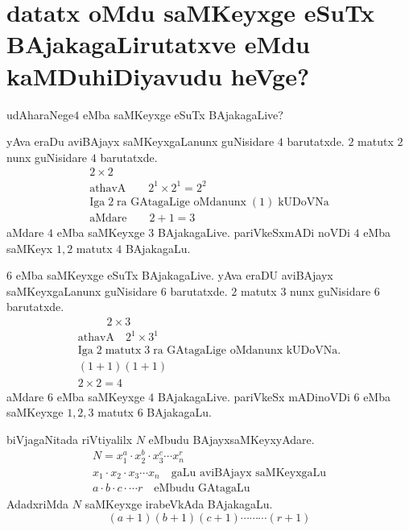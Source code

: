 \chapter{{\bf datatx oMdu saMKeyxge eSuTx BAjakagaLirutatxve eMdu kaMDuhiDiyavudu heVge?}}


udAharaNege\quad $4$ eMba saMKeyxge eSuTx BAjakagaLive?

yAva eraDu aviBAjayx saMKeyxgaLanunx guNisidare $4$ barutatxde. $2$ matutx $2$ nunx guNisidare $4$ barutatxde.
\begin{gather*}
2\times 2\\
\text{athavA} \qquad 2^1\times 2^1 = 2^2\\
\text{Iga}\; 2 \;\text{ra GAtagaLige oMdanunx} \;(1)\; \text{kUDoVNa}\\
\text{aMdare}\qquad 2+1 =3
\end{gather*}
aMdare $4$ eMba saMKeyxge $3$ BAjakagaLive. pariVkeSxmADi noVDi $4$ eMba saMKeyx $1,2$ matutx $4$ BAjakagaLu. 


$6$ eMba saMKeyxge eSuTx BAjakagaLive. yAva eraDU aviBAjayx saMKeyxgaLanunx guNisidare $6$ barutatxde.
$2$ matutx $3$ nunx guNisidare $6$ barutatxde.
\begin{gather*}
\qquad\;\; 2 \times 3\\
\text{athavA}\quad 2^1 \times 3^1\\
\text{Iga} \;2\; \text{matutx} \;3\; \text{ra GAtagaLige oMdanunx kUDoVNa.}\\
(1+1)(1+1)\\
2\times 2 =4 
\end{gather*}
aMdare $6$ eMba saMKeyxge $4$ BAjakagaLive. pariVkeSx mADinoVDi $6$ eMba saMKeyxge $1,2,3$ matutx $6$ BAjakagaLu.

biVjagaNitada riVtiyalilx $N$ eMbudu BAjayxsaMKeyxyAdare.
\begin{gather*}
N=x_1^a \cdot x_2^b\cdot x_3^c \cdots x_n^r\\
x_1\cdot x_2\cdot x_3 \cdots x_n \quad\text{gaLu aviBAjayx saMKeyxgaLu}\\
a \cdot b\cdot c\cdot \cdots r \quad\text{eMbudu GAtagaLu}
\end{gather*}
AdadxriMda $N$ saMKeyxge irabeVkAda BAjakagaLu.
$$
(a+1)(b+1)(c+1)\cdots\cdots\cdots(r+1)
$$

